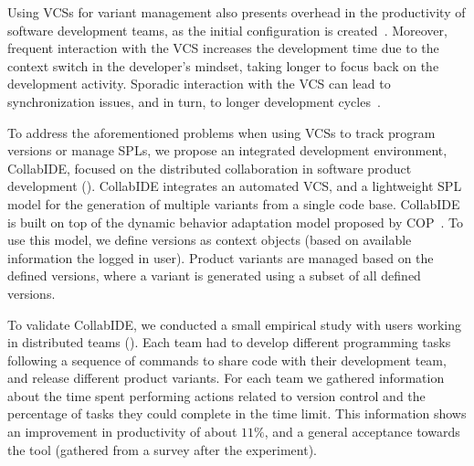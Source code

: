 Using \acp{VCS} for variant management also presents overhead in the productivity of software development teams, as the initial configuration is created~\cite{niu14}.
Moreover, frequent interaction with the \ac{VCS} increases the development time due to the context switch in the developer's mindset, taking longer to focus back on the development activity. Sporadic interaction with the \ac{VCS} can lead to synchronization issues, and in turn, to longer development cycles~\cite{schwagerl15}.  

To address the aforementioned problems when using \acp{VCS} to track program versions or manage \acp{SPL}, we propose an integrated development environment, CollabIDE, focused on the distributed  collaboration in software product development (). CollabIDE integrates an automated \ac{VCS}, and a lightweight \ac{SPL} model for the generation of multiple variants from a single code base. 
CollabIDE is built on top of the dynamic behavior adaptation model proposed by \ac{COP}~\cite{salvaneschi+12survey}. To use this model, we define versions as context objects (based on available information \eg the logged in user).
Product variants are managed based on the defined versions, where a variant is generated using a subset of all defined versions.

To validate CollabIDE, we conducted a small empirical study with users working in distributed teams 
(). Each team had to develop different programming tasks following a sequence of 
commands to share code with their development team, and release different product variants. For each 
team we gathered information about the time spent performing actions related to version control and the 
percentage of tasks they could complete in the time limit. This information shows an improvement in 
productivity of about $11\%$, and a general acceptance towards the tool (gathered from a survey after 
the experiment).
 


\endinput

With CollabIDE, we aim to solve the overhead problems that exists in these development models with 
features that aim to reduce the time developers must spend doing actions related to version control or 
setting up a project that uses \acp{SPL}.
